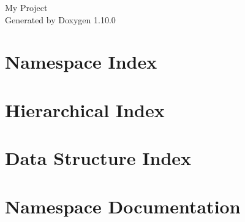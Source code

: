 \documentclass[twoside]{book}
\newcommand{\+}{\discretionary{\mbox{\scriptsize$\hookleftarrow$}}{}{}}
\newcommand{\clearemptydoublepage}{%
    \newpage{\pagestyle{empty}\cleardoublepage}%
  }
\begin{document}
  \raggedbottom
    \hypersetup{pageanchor=false,
                bookmarksnumbered=true,
                pdfencoding=unicode
               }
  \begin{titlepage}
  \vspace*{7cm}
  \begin{center}%
  {\Large My Project}\\
  \vspace*{1cm}
  {\large Generated by Doxygen 1.10.0}\\
  \end{center}
  \end{titlepage}
  \clearemptydoublepage
  \tableofcontents
  \clearemptydoublepage
  \hypersetup{pageanchor=true}

\chapter{Namespace Index}

\chapter{Hierarchical Index}

\chapter{Data Structure Index}

\chapter{Namespace Documentation}

\end{document}
